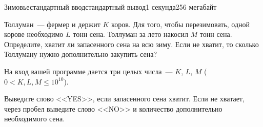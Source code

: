 \begin{problem}{Зимовье}{стандартный ввод}{стандартный вывод}{1 секунда}{256 мегабайт}

Толлуман~--- фермер и держит $K$ коров. Для того, чтобы перезимовать, одной корове необходимо $L$ тонн сена. Толлуман за лето накосил $M$ тонн сена. Определите, хватит ли запасенного сена на всю зиму. Если не хватит, то сколько Толлуману нужно дополнительно закупить сена?

\InputFile
На вход вашей программе дается три целых числа~--- $K$, $L$, $M$ ($0<K,L,M\leq10^{10}$).

\OutputFile
Выведите слово <<YES>>, если запасенного сена хватит. Если не хватает, через пробел выведите слово <<NO>> и количество дополнительно необходимого сена.

\Examples

\begin{example}
%
%
\end{example}

\end{problem}

